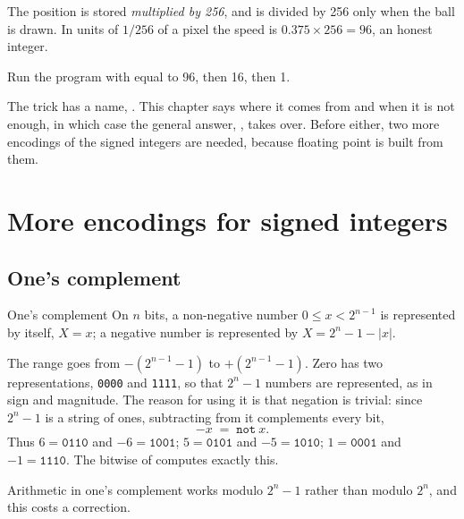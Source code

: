 The position is stored \emph{multiplied by 256}, and is divided by 256 only
when the ball is drawn. In units of $1/256$ of a pixel the speed is
$0.375\times 256 = 96$, an honest integer.

\begin{prgtry}
Run the program with  equal to 96, then 16, then 1.
\end{prgtry}

The trick has a name, . This chapter says where it comes
from and when it is not enough, in which case the general answer,
, takes over. Before either, two more encodings of the
signed integers are needed, because floating point is built from them.

\section{More encodings for signed integers}

\subsection{One's complement}

\begin{definition}{One's complement}
On $n$ bits, a non-negative number $0\le x<2^{n-1}$ is represented by itself,
$X=x$; a negative number is represented by $X = 2^{n}-1-|x|$.
\end{definition}

The range goes from $-(2^{n-1}-1)$ to $+(2^{n-1}-1)$. Zero has two
representations, \texttt{0000} and \texttt{1111}, so that $2^{n}-1$ numbers
are represented, as in sign and magnitude. The reason for using it is that
negation is trivial: since $2^{n}-1$ is a string of ones, subtracting from it
complements every bit,
\[ -x \;=\; \mathtt{not}\ x. \]
Thus $6=\texttt{0110}$ and $-6=\texttt{1001}$; $5=\texttt{0101}$ and
$-5=\texttt{1010}$; $1=\texttt{0001}$ and $-1=\texttt{1110}$. The bitwise
 of \riscv computes exactly this.

Arithmetic in one's complement works modulo $2^{n}-1$ rather than modulo
$2^{n}$, and this costs a correction.

